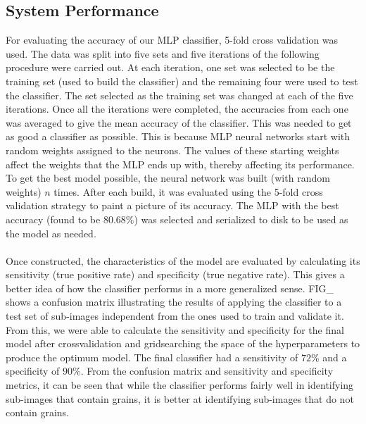 \bigskip

\goodbreak

\subsection{System Performance}
For evaluating the accuracy of our MLP classifier, 5-fold cross validation was used. The data was split into five sets and five iterations of the following procedure were carried out. At each iteration, one set was selected to be the training set (used to build the classifier) and the remaining four were used to test the classifier. The set selected as the training set was changed at each of the five iterations. Once all the iterations were completed, the accuracies from each one was averaged to give the mean accuracy of the classifier. This was needed to get as good a classifier as possible. This is because MLP neural networks start with random weights assigned to the neurons. The values of these starting weights affect the weights that the MLP ends up with, thereby affecting its performance. To get the best model possible, the neural network was built (with random weights) $n$ times. After each build, it was evaluated using the 5-fold cross validation strategy to paint a picture of its accuracy. The MLP with the best accuracy (found to be $80.68\%$) was selected and serialized to disk to be used as the model as needed.\\ \\
%
Once constructed, the characteristics of the model are evaluated by calculating its sensitivity (true positive rate) and specificity (true negative rate). This gives a better idea of how the classifier performs in a more generalized sense. FIG\_ shows a confusion matrix illustrating the results of applying the classifier to a test set of sub-images independent from the ones used to train and validate it. From this, we were able to calculate the sensitivity and specificity for the final model after crossvalidation and gridsearching the space of the hyperparameters to produce the optimum model. The final classifier had a sensitivity of $72\%$ and a specificity of $90\%$. From the confusion matrix and sensitivity and specificity metrics, it can be seen that while the classifier performs fairly well in identifying sub-images that contain grains, it is better at identifying sub-images that do not contain grains.     
